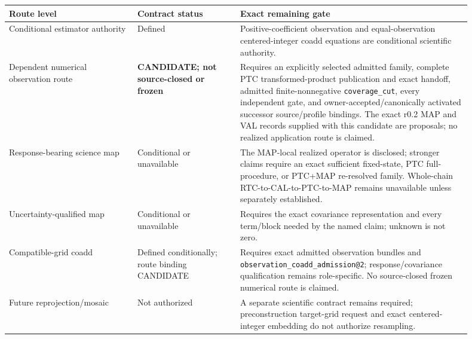 \documentclass[10pt]{article}
\newcommand{\code}[1]{\nolinkurl{#1}}
\begin{document}
\begin{longtable}{L{0.25\linewidth}L{0.20\linewidth}L{0.45\linewidth}}
\toprule
Route level & Contract status & Exact remaining gate\\
\midrule
Conditional estimator authority & Defined & Positive-coefficient observation and equal-observation centered-integer coadd equations are conditional scientific authority.\\
Dependent numerical observation route & \textbf{CANDIDATE; not source-closed or frozen} & Requires an explicitly selected admitted family, complete PTC transformed-product publication and exact handoff, admitted finite-nonnegative \code{coverage\_cut}, every independent gate, and owner-accepted/canonically activated successor source/profile bindings. The exact r0.2 MAP and VAL records supplied with this candidate are proposals; no realized application route is claimed.\\
Response-bearing science map & Conditional or unavailable & The MAP-local realized operator is disclosed; stronger claims require an exact sufficient fixed-state, PTC full-procedure, or PTC+MAP re-resolved family. Whole-chain RTC-to-CAL-to-PTC-to-MAP remains unavailable unless separately established.\\
Uncertainty-qualified map & Conditional or unavailable & Requires the exact covariance representation and every term/block needed by the named claim; unknown is not zero.\\
Compatible-grid coadd & Defined conditionally; route binding CANDIDATE & Requires exact admitted observation bundles and \code{observation\_coadd\_admission@2}; response/covariance qualification remains role-specific. No source-closed frozen numerical route is claimed.\\
Future reprojection/mosaic & Not authorized & A separate scientific contract remains required; preconstruction target-grid request and exact centered-integer embedding do not authorize resampling.\\
\bottomrule
\end{longtable}
\end{document}
